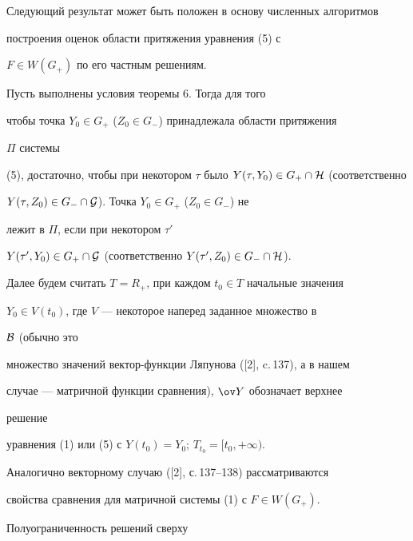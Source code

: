 {Следующий результат может быть положен в основу численных алгоритмов 


построения оценок области притяжения уравнения (5) с 


$F\in W(G_+)$ по его частным решениям. 


 


\begin{cor} 


Пусть выполнены условия теоремы 6. Тогда для того 


чтобы точка $Y_0\in G_+$ ($Z_0\in G_-$) принадлежала области притяжения 


$\Pi$ системы 


(5), достаточно, чтобы при некотором $\tau$ было $Y(\tau,Y_0)\in G_+\cap 


\cal H$ (соответственно 


$Y(\tau,Z_0)\in G_-\cap\cal G$). Точка $Y_0\in G_+$ ($Z_0\in G_-$) не 


лежит в $\Pi$, если при некотором $\tau'$\; 


$Y(\tau',Y_0)\in G_+\cap \cal G$ (соответственно $Y(\tau',Z_0)\in 


G_-\cap\cal H$). 


\end{cor} 


 


Далее будем считать $T=R_+$, при каждом $t_0\in T$ начальные значения 


$Y_0\in V(t_0)$, где $V$ --- некоторое наперед заданное множество в 


$\cal B$ (обычно это 


множество значений вектор-функции Ляпунова ([2], c.\,137), а в нашем 


случае --- матричной функции сравнения), $\ov Y$ обозначает верхнее 


решение 


уравнения (1) или (5) с $Y(t_0)=Y_0$; $T_{t_0}=[t_0,+\infty)$. 


 


Аналогично векторному случаю ([2], с.\,137--138) рассматриваются 


свойства сравнения для матричной системы (1) с $F\in W(G_+)$. 


 


Полуограниченность решений сверху 


\begin{multline*} 



\end{multline*}}

